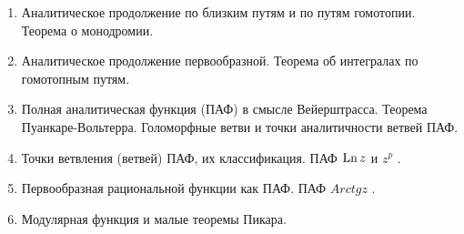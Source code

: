 \begin{enumerate}
\item Аналитическое продолжение по близким путям и по путям гомотопии. 
      Теорема о монодромии.
\item Аналитическое продолжение первообразной. Теорема об интегралах  по 
      гомотопным путям.
\item Полная аналитическая функция  (ПАФ)  в смысле Вейерштрасса. 
      Теорема Пуанкаре-Вольтерра. Голоморфные ветви и точки аналитичности  
      ветвей ПАФ. 
\item Точки ветвления (ветвей) ПАФ, их классификация. ПАФ $\operatorname{Ln} z$ и $z^p$  . 
\item Первообразная рациональной функции как ПАФ. ПАФ $Arctg z$ . 
\item Модулярная функция и малые теоремы Пикара. 

\end{enumerate}